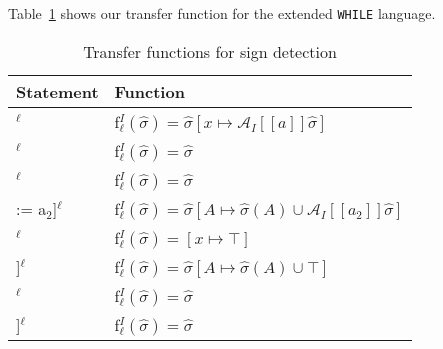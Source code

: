 Table~\ref{table:interval_analysis_functions} shows our transfer function for the extended \texttt{WHILE} language.
\begin{table}[h]
\begin{tabular}{| l | l |}
  \hline
  Statement & Function \\
  \hline
  \hline
  [x := a]$^\ell$ & f$_\ell^I (\widehat{\sigma}) = \widehat{\sigma}[x \mapsto \mathcal{A}_I[\![a]\!] \widehat{\sigma} ]$ \\
  \hline
 [skip]$^\ell$ & f$_\ell^I (\widehat{\sigma}) = \widehat{\sigma}$\\
  \hline
 [b]$^\ell$ & f$_\ell^I (\widehat{\sigma}) = \widehat{\sigma}$\\
  \hline
  [A[a$_1$] := a$_2$]$^\ell$ & f$_\ell^I (\widehat{\sigma}) = \widehat{\sigma}[A\mapsto \widehat{\sigma}(A)\cup \mathcal{A}_I[\![a_2]\!] \widehat{\sigma}]$\\
  \hline
  [read x]$^\ell$ & f$_\ell^I (\widehat{\sigma}) = [x \mapsto \top]$ \\
  \hline
  [read A[a]]$^\ell$ & f$_\ell^I (\widehat{\sigma}) =  \widehat{\sigma}[A\mapsto \widehat{\sigma}(A)\cup \top]$\\
  \hline
  [write x]$^\ell$ & f$_\ell^I (\widehat{\sigma}) = \widehat{\sigma}$\\
  \hline
  [write A[n]]$^\ell$ & f$_\ell^I (\widehat{\sigma}) = \widehat{\sigma}$\\
  \hline
\end{tabular}
\centering
\caption{Transfer functions for sign detection}
\label{table:interval_analysis_functions}
\end{table}


